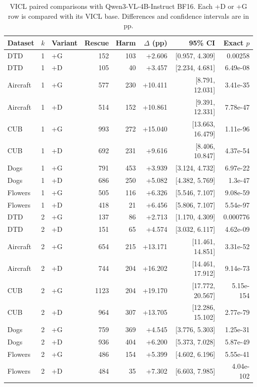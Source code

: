 \documentclass[10pt,twocolumn,letterpaper]{article}
\begin{document}
\begin{table}[t]
\caption{VICL paired comparisons with Qwen3-VL-4B-Instruct BF16. Each +D or +G row is compared with its VICL base. Differences and confidence intervals are in pp.}
\label{sup:vicl_paired_qwen3}
\centering\small\setlength{\tabcolsep}{6pt}
\begin{tabular}{lllrrrrr}
\toprule
Dataset & $k$ & Variant & Rescue & Harm & $\Delta$ (pp) & 95\% CI & Exact $p$ \\
\midrule
DTD & 1 & +G & 152 & 103 & +2.606 & [0.957, 4.309] & 0.00258 \\
DTD & 1 & +D & 105 & 40 & +3.457 & [2.234, 4.681] & 6.49e-08 \\
Aircraft & 1 & +G & 577 & 230 & +10.411 & [8.791, 12.031] & 3.41e-35 \\
Aircraft & 1 & +D & 514 & 152 & +10.861 & [9.391, 12.331] & 7.78e-47 \\
CUB & 1 & +G & 993 & 272 & +15.040 & [13.663, 16.479] & 1.11e-96 \\
CUB & 1 & +D & 692 & 231 & +9.616 & [8.406, 10.847] & 4.37e-54 \\
Dogs & 1 & +G & 791 & 453 & +3.939 & [3.124, 4.732] & 6.97e-22 \\
Dogs & 1 & +D & 686 & 250 & +5.082 & [4.382, 5.769] & 1.3e-47 \\
Flowers & 1 & +G & 505 & 116 & +6.326 & [5.546, 7.107] & 9.08e-59 \\
Flowers & 1 & +D & 418 & 21 & +6.456 & [5.806, 7.107] & 5.54e-97 \\
DTD & 2 & +G & 137 & 86 & +2.713 & [1.170, 4.309] & 0.000776 \\
DTD & 2 & +D & 151 & 65 & +4.574 & [3.032, 6.117] & 4.62e-09 \\
Aircraft & 2 & +G & 654 & 215 & +13.171 & [11.461, 14.851] & 3.31e-52 \\
Aircraft & 2 & +D & 744 & 204 & +16.202 & [14.461, 17.912] & 9.14e-73 \\
CUB & 2 & +G & 1123 & 204 & +19.170 & [17.772, 20.567] & 5.15e-154 \\
CUB & 2 & +D & 964 & 307 & +13.705 & [12.286, 15.102] & 2.77e-79 \\
Dogs & 2 & +G & 759 & 369 & +4.545 & [3.776, 5.303] & 1.25e-31 \\
Dogs & 2 & +D & 936 & 404 & +6.200 & [5.373, 7.028] & 5.87e-49 \\
Flowers & 2 & +G & 486 & 154 & +5.399 & [4.602, 6.196] & 5.55e-41 \\
Flowers & 2 & +D & 484 & 35 & +7.302 & [6.603, 7.985] & 4.04e-102 \\
\bottomrule
\end{tabular}
\end{table}
\end{document}
